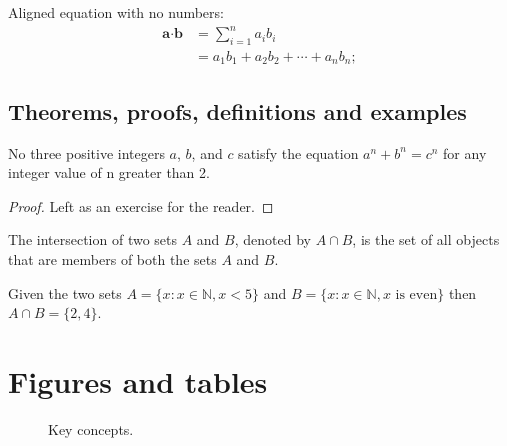 Aligned equation with no numbers:
\begin{align*} %
	\label{eq:dot product}
	\textbf{a} \cdot \textbf{b} &= \sum_{i=1}^n a_ib_i \\
	&= a_1b_1 + a_2b_2 + \cdots + a_nb_n;
\end{align*}

\subsection{Theorems, proofs, definitions and examples}

\begin{theorem}
No three positive integers $a$, $b$, and $c$ satisfy the equation $a^n + b^n = c^n$ for any integer value of n greater than 2.
\end{theorem}

\begin{proof}
Left as an exercise for the reader.
\end{proof}

\begin{definition}
The intersection of two sets $A$ and $B$, denoted by $A \cap B$, is the set of all objects that are members of both the sets $A$ and $B$.
\end{definition}

\begin{example}
Given the two sets $A = \{x:x\in \mathbb{N}, x < 5\}$ and $B = \{x:x \in \mathbb{N}, x \text{ is even}\}$ then $A \cap B = \{2, 4\}$.
\end{example}


\section{Figures and tables}

\begin{figure}[H]
	\begin{center}
		\caption{Key concepts.} %
		\label{fig:key concepts} %
	\end{center}
\end{figure}

